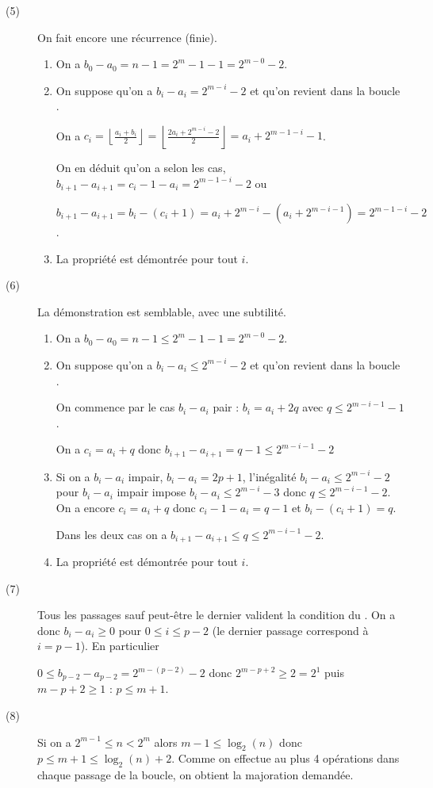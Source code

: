 \begin{description}
\item[(5)] On fait encore une récurrence (finie).

\begin{enumerate}
    \item On a $b_0 - a_0 = n-1 = 2^m -1 -1 = 2^{m-0}-2$.
 \item On suppose qu'on a $b_i - a_i = 2^{m-i}-2$ et qu'on revient dans la boucle .
 
 On a $c_i = \left\lfloor\frac{a_i + b_i}2\right\rfloor = \left\lfloor\frac{2a_i + 2^{m-i}-2}2\right\rfloor = a_i + 2^{m-1-i} -1$.
 
 On en déduit qu'on a selon les cas, $b_{i+1}- a_{i+1} = c_i - 1 - a_i =2^{m-1-i} -2$ ou
 
$b_{i+1}- a_{i+1} = b_i - (c_i+1) = a_i + 2^{m-i}-(a_i + 2^{m-i-1}) = 2^{m-1-i} -2$.

\item La propriété est démontrée pour tout $i$.
 
\end{enumerate}


\item[(6)] La démonstration est semblable, avec une subtilité.

\begin{enumerate}
    \item On a $b_0 - a_0 = n-1 \le 2^m -1 -1 = 2^{m-0}-2$.
 \item On suppose qu'on a $b_i - a_i \le 2^{m-i}-2$ et qu'on revient dans la boucle .
 
On commence par le cas $b_i-a_i$ pair : $b_i = a_i + 2q$ avec $q\le 2^{m-i-1}-1$.

On a $c_i=a_i+q$ donc $b_{i+1}-a_{i+1} = q-1\le 2^{m-i-1}-2$
 
\item Si on a $b_i-a_i$ impair, $b_i-a_i = 2p +1$, l'inégalité $b_i-a_i \le 2^{m-i} -2$ pour $b_i-a_i$ impair impose $b_i-a_i \le 2^{m-i} -3$ donc $q\le 2^{m-i-1}-2$. On a encore  $c_i=a_i+q$ donc $c_i -1 - a_i = q - 1$ et $b_i - (c_i+1)=q$.

Dans les deux cas on a $b_{i+1}-a_{i+1} \le q \le 2^{m-i-1}-2$.

\item La propriété est démontrée pour tout $i$.
 
\end{enumerate}


\item[(7)] Tous les passages sauf peut-être le dernier valident la condition du . On a donc $b_i - a_i \ge 0$ pour $0\le i \le p-2$ (le dernier passage correspond à $i = p-1$). En particulier

$0\le b_{p-2} - a_{p-2} = 2^{m-(p-2)} -2$ donc $2^{m-p+2} \ge 2 = 2^1$ puis $m-p+2 \ge 1$ : $p\le m+1$.

\item[(8)] Si on a $2^{m-1}\le n < 2^m$ alors $m-1\le \log_2(n)$ donc $p\le m+1\le \log_2(n) +2$.
Comme on effectue au plus 4 opérations dans chaque passage de la boucle, on obtient la majoration demandée.

\end{description}




